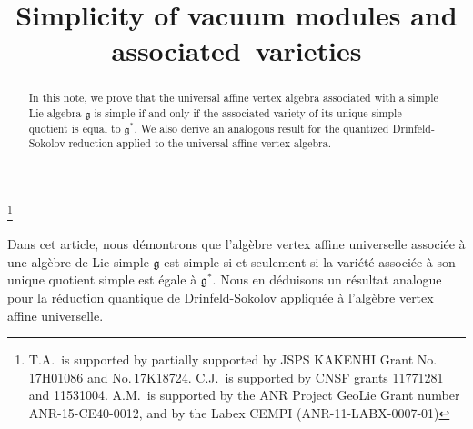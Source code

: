 \documentclass[JEP,XML,SOM,Unicode]{cedram}
\theoremstyle{definition}
\begin{document}
\frontmatter
\title{Simplicity of vacuum modules and associated~varieties}

\author[\initial{T.} \lastname{Arakawa}]{ }
\address{Research Institute for Mathematical Sciences, Kyoto University\\ Kyoto, 606-8502, Japan}

\author[\initial{C.} \lastname{Jiang}]{ }
\address{School of Mathematical Sciences, Shanghai Jiao Tong University\\ Shanghai, 200240, China}

\author[\initial{A.} \lastname{Moreau}]{ }
\address{Faculté des Sciences d'Orsay, Université Paris-Saclay\\
91405 Orsay, France}

\thanks{T.A.\ is supported by partially supported by JSPS KAKENHI Grant No.\,17H01086 and No.\,17K18724. C.J.\ is supported by CNSF grants 11771281 and 11531004. A.M.\ is supported by the ANR Project GeoLie Grant number ANR-15-CE40-0012, and by the Labex CEMPI (ANR-11-LABX-0007-01)}





\begin{abstract}
In this note, we prove that the universal affine vertex algebra associated with a simple Lie algebra $\mathfrak{g}$ is simple if and only if the associated variety of its unique simple quotient is equal to $\mathfrak{g}^*$. We also derive an analogous result for the quantized Drinfeld-Sokolov reduction applied to the universal affine vertex algebra.
\end{abstract}

\begin{altabstract}
Dans cet article, nous démontrons que l’algèbre vertex affine universelle associée à une algèbre de Lie simple $\mathfrak{g}$ est simple si et seulement si la variété associée à son unique quotient simple est égale à $\mathfrak{g}^*$. Nous en déduisons un résultat analogue pour la réduction quantique de Drinfeld-Sokolov appliquée à l’algèbre vertex affine universelle.
\end{altabstract}
\maketitle
\end{document}
